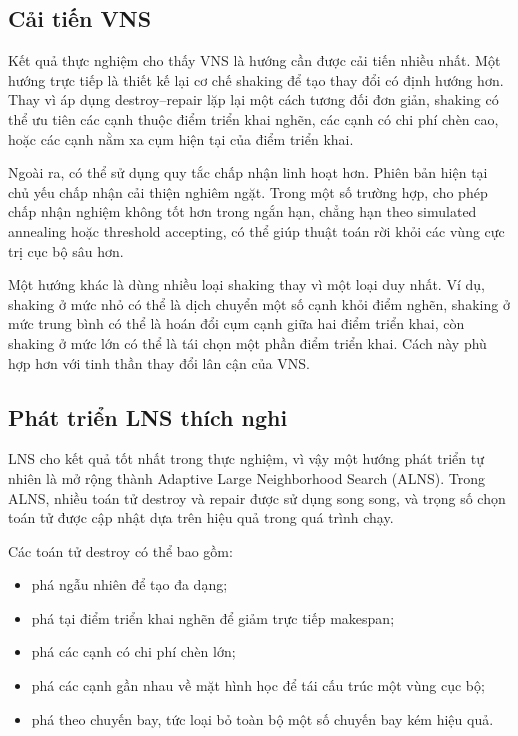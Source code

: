 \subsection{Cải tiến VNS}
\label{subsec:future-vns}

Kết quả thực nghiệm cho thấy VNS là hướng cần được cải tiến nhiều nhất. Một hướng trực tiếp là thiết kế lại cơ chế shaking để tạo thay đổi có định hướng hơn. Thay vì áp dụng destroy--repair lặp lại một cách tương đối đơn giản, shaking có thể ưu tiên các cạnh thuộc điểm triển khai nghẽn, các cạnh có chi phí chèn cao, hoặc các cạnh nằm xa cụm hiện tại của điểm triển khai.

Ngoài ra, có thể sử dụng quy tắc chấp nhận linh hoạt hơn. Phiên bản hiện tại chủ yếu chấp nhận cải thiện nghiêm ngặt. Trong một số trường hợp, cho phép chấp nhận nghiệm không tốt hơn trong ngắn hạn, chẳng hạn theo simulated annealing hoặc threshold accepting, có thể giúp thuật toán rời khỏi các vùng cực trị cục bộ sâu hơn.

Một hướng khác là dùng nhiều loại shaking thay vì một loại duy nhất. Ví dụ, shaking ở mức nhỏ có thể là dịch chuyển một số cạnh khỏi điểm nghẽn, shaking ở mức trung bình có thể là hoán đổi cụm cạnh giữa hai điểm triển khai, còn shaking ở mức lớn có thể là tái chọn một phần điểm triển khai. Cách này phù hợp hơn với tinh thần thay đổi lân cận của VNS.

\subsection{Phát triển LNS thích nghi}
\label{subsec:future-alns}

LNS cho kết quả tốt nhất trong thực nghiệm, vì vậy một hướng phát triển tự nhiên là mở rộng thành Adaptive Large Neighborhood Search (ALNS). Trong ALNS, nhiều toán tử destroy và repair được sử dụng song song, và trọng số chọn toán tử được cập nhật dựa trên hiệu quả trong quá trình chạy.

Các toán tử destroy có thể bao gồm:
\begin{itemize}
    \item phá ngẫu nhiên để tạo đa dạng;
    \item phá tại điểm triển khai nghẽn để giảm trực tiếp makespan;
    \item phá các cạnh có chi phí chèn lớn;
    \item phá các cạnh gần nhau về mặt hình học để tái cấu trúc một vùng cục bộ;
    \item phá theo chuyến bay, tức loại bỏ toàn bộ một số chuyến bay kém hiệu quả.
\end{itemize}

